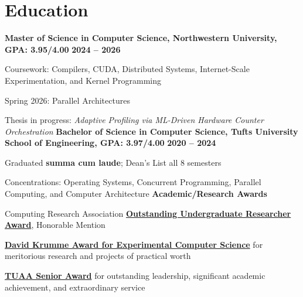 \documentclass[10pt]{article}
\newenvironment{mylist}[1][]
{\itemize[nosep, wide=0pt, leftmargin=*, after=\strut]}
{\enditemize}
\begin{document}
\section{Education}
\begin{minipage}[t]{\linewidth}
    \textbf{Master of Science in Computer Science, Northwestern University, GPA: 3.95/4.00 } \hfill \textbf{2024 -- 2026}
    \begin{mylist}
        \item Coursework: Compilers, CUDA, Distributed Systems, Internet-Scale Experimentation, and Kernel Programming
        \item Spring 2026: Parallel Architectures
        \item Thesis in progress: \textit{Adaptive Profiling via ML-Driven Hardware Counter Orchestration}
    \end{mylist}
    \vspace{0.5em}
    \textbf{Bachelor of Science in Computer Science, Tufts University School of Engineering, GPA: 3.97/4.00} \hfill \textbf{2020 -- 2024}
    \begin{mylist}
        \item Graduated \textbf{summa cum laude}; Dean's List all 8 semesters
        \item Concentrations: Operating Systems, Concurrent Programming, Parallel Computing, and Computer Architecture
    \end{mylist}
    \vspace{0.5em}
    \textbf{Academic/Research Awards}
    \begin{mylist}
        \item Computing Research Association \href{https://engineering.tufts.edu/cs/research/undergraduate-research/undergrad-research-award-nominees}{\textbf{Outstanding Undergraduate Researcher Award}}, Honorable Mention
        \item \href{https://engineering.tufts.edu/cs/news-events/awards/past-award-winners}{\textbf{David Krumme Award for Experimental Computer Science}} for  meritorious research and projects of practical worth
        \item \href{https://alumniandfriends.tufts.edu/2024-senior-awardee-liam-strand-e24}{\textbf{TUAA Senior Award}} for outstanding leadership, significant academic achievement, and extraordinary service
    \end{mylist}
\end{minipage}
\end{document}
